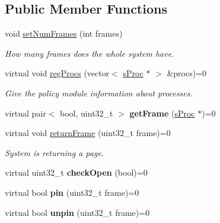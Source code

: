\subsection*{\-Public \-Member \-Functions}
\begin{DoxyCompactItemize}
\item 
\hypertarget{classcFrameAllocPolicy_a1cae75820fa891b9dd9680c7e72c6903}{void \hyperlink{classcFrameAllocPolicy_a1cae75820fa891b9dd9680c7e72c6903}{set\-Num\-Frames} (int frames)}\label{d3/dd2/classcFrameAllocPolicy_a1cae75820fa891b9dd9680c7e72c6903}

\begin{DoxyCompactList}\small\item\em \-How many frames does the whole system have. \end{DoxyCompactList}\item 
virtual void \hyperlink{classcFrameAllocPolicy_a84e52441bcbb0a571bbcf1a7209cd662}{reg\-Procs} (vector$<$ \hyperlink{structsProc}{s\-Proc} $\ast$ $>$ \&procs)=0
\begin{DoxyCompactList}\small\item\em \-Give the policy module information about processes. \end{DoxyCompactList}\item 
\hypertarget{classcFrameAllocPolicy_a43bd6cfdaa2c03c31dc246c894b03f6c}{virtual pair$<$ bool, uint32\-\_\-t $>$ {\bfseries get\-Frame} (\hyperlink{structsProc}{s\-Proc} $\ast$)=0}\label{d3/dd2/classcFrameAllocPolicy_a43bd6cfdaa2c03c31dc246c894b03f6c}

\item 
virtual void \hyperlink{classcFrameAllocPolicy_a40446e60eefff1fe2a72252af007c877}{return\-Frame} (uint32\-\_\-t frame)=0
\begin{DoxyCompactList}\small\item\em \-System is returning a page. \end{DoxyCompactList}\item 
\hypertarget{classcFrameAllocPolicy_a444e4c60f59041dbd840c18f4fe54a38}{virtual uint32\-\_\-t {\bfseries check\-Open} (bool)=0}\label{d3/dd2/classcFrameAllocPolicy_a444e4c60f59041dbd840c18f4fe54a38}

\item 
\hypertarget{classcFrameAllocPolicy_a3b1e7dc504fdd5f05d99e921b4f696cb}{virtual bool {\bfseries pin} (uint32\-\_\-t frame)=0}\label{d3/dd2/classcFrameAllocPolicy_a3b1e7dc504fdd5f05d99e921b4f696cb}

\item 
\hypertarget{classcFrameAllocPolicy_a1ba7066e5020bbaa48badde38e8208ca}{virtual bool {\bfseries unpin} (uint32\-\_\-t frame)=0}\label{d3/dd2/classcFrameAllocPolicy_a1ba7066e5020bbaa48badde38e8208ca}

\end{DoxyCompactItemize}
